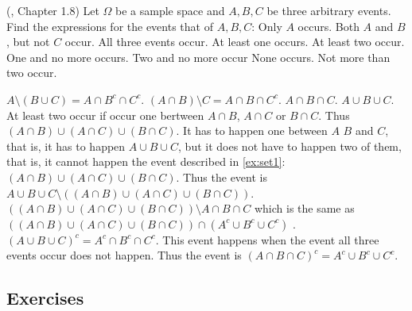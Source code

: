 \documentclass[12pt]{article}
\newcommand{\<}{{\langle \!\! \langle}}
\renewcommand{\>}{{\rangle \!\! \rangle}}
\begin{document}


\begin{ExerciseList}
	\Exercise (\cite{Feller}, Chapter 1.8) Let $\Omega$ be a sample space and $A,B, C$ be three arbitrary events. Find the expressions for the events that of $A,B,C$:
        \Question Only $A$ occurs.
	\Question  Both $A$ and $B$, but not $C$ occur. 
	\Question  All three events occur. 
	\Question  At least one occurs.
	\Question  At least two occur. 
	\Question  One and no more occurs.
	\Question  Two and no more occur 
	\Question  None occurs. 
	\Question  Not more than two occur.
	
	\Answer

	\Question	$A\setminus (B\cup C)=A\cap B^c \cap C^c$.
	\Question	$ (A\cap B)\setminus C = A\cap B \cap C^c$.
	\Question	$ A\cap B \cap C$.
	\Question	$ A\cup B \cup C$.
	\Question	\label{ex:set1} At least two occur if occur one bertween $A\cap B$, $A\cap C$ or $B\cap C$. Thus $ (A \cap B)\cup (A\cap C) \cup ( B \cap C)$. 
        \Question        It has to happen one between $A$ $B$ and $C$, that is, it has to happen $A\cup B \cup C$, but it does not have to happen two of them, that is, it cannot happen the event described in \ref{ex:set1}: 
	\Question	  $ (A \cap B)\cup (A\cap C) \cup ( B \cap C)$. Thus the event is $A\cup B \cup C \setminus ((A \cap B)\cup (A\cap C) \cup ( B \cap C))$.
	\Question	$ \left((A \cap B) \cup (A \cap C) \cup (B \cap C) \right)\setminus A \cap B \cap C $ which is the same as  $ \left((A \cap B) \cup (A \cap C) \cup (B \cap C) \right) \cap (A^c \cup B^c \cup  C^c) $ .
	\Question	$(A\cup B \cup C)^c= A^c\cap B^c \cap C^c$. 
	\Question	This event happens when the event all three events occur does not happen. Thus the event is $(A \cap B \cap C)^c =A^c \cup B^c \cup C^c. $

\end{ExerciseList}

\subsection{Exercises}
\end{document}
